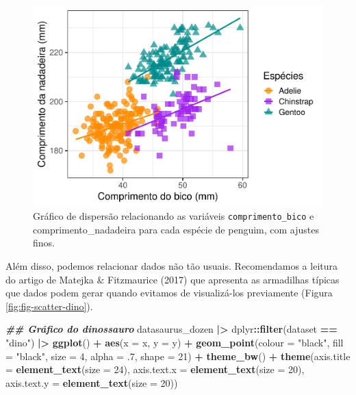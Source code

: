 \documentclass[
]{article}
\newenvironment{Shaded}{\begin{snugshade}}{\end{snugshade}}
\newcommand{\AttributeTok}[1]{\textcolor[rgb]{0.13,0.29,0.53}{#1}}
\newcommand{\DecValTok}[1]{\textcolor[rgb]{0.00,0.00,0.81}{#1}}
\newcommand{\DocumentationTok}[1]{\textcolor[rgb]{0.56,0.35,0.01}{\textbf{\textit{#1}}}}
\newcommand{\FunctionTok}[1]{\textcolor[rgb]{0.13,0.29,0.53}{\textbf{#1}}}
\newcommand{\NormalTok}[1]{#1}
\newcommand{\SpecialCharTok}[1]{\textcolor[rgb]{0.81,0.36,0.00}{\textbf{#1}}}
\newcommand{\StringTok}[1]{\textcolor[rgb]{0.31,0.60,0.02}{#1}}
\begin{document}
\begin{figure}
\centering
\includegraphics{epr_files/figure-latex/fig-scatter-fino-1.pdf}
\caption{\label{fig:fig-scatter-fino}Gráfico de dispersão relacionando as variáveis \texttt{comprimento\_bico} e comprimento\_nadadeira para cada espécie de penguim, com ajustes finos.}
\end{figure}

Além disso, podemos relacionar dados não tão usuais. Recomendamos a leitura do artigo de Matejka \& Fitzmaurice (2017) que apresenta as armadilhas típicas que dados podem gerar quando evitamos de visualizá-los previamente (Figura \ref{fig:fig-scatter-dino}).

\begin{Shaded}
\begin{Highlighting}[]
\DocumentationTok{\#\# Gráfico do dinossauro}
\NormalTok{datasaurus\_dozen }\SpecialCharTok{|\textgreater{}} 
\NormalTok{    dplyr}\SpecialCharTok{::}\FunctionTok{filter}\NormalTok{(dataset }\SpecialCharTok{==} \StringTok{"dino"}\NormalTok{) }\SpecialCharTok{|\textgreater{}} 
    \FunctionTok{ggplot}\NormalTok{() }\SpecialCharTok{+}
    \FunctionTok{aes}\NormalTok{(}\AttributeTok{x =}\NormalTok{ x, }\AttributeTok{y =}\NormalTok{ y) }\SpecialCharTok{+}
    \FunctionTok{geom\_point}\NormalTok{(}\AttributeTok{colour =} \StringTok{"black"}\NormalTok{, }\AttributeTok{fill =} \StringTok{"black"}\NormalTok{, }
               \AttributeTok{size =} \DecValTok{4}\NormalTok{, }\AttributeTok{alpha =}\NormalTok{ .}\DecValTok{7}\NormalTok{, }\AttributeTok{shape =} \DecValTok{21}\NormalTok{) }\SpecialCharTok{+}
    \FunctionTok{theme\_bw}\NormalTok{() }\SpecialCharTok{+}
    \FunctionTok{theme}\NormalTok{(}\AttributeTok{axis.title =} \FunctionTok{element\_text}\NormalTok{(}\AttributeTok{size =} \DecValTok{24}\NormalTok{),}
          \AttributeTok{axis.text.x =} \FunctionTok{element\_text}\NormalTok{(}\AttributeTok{size =} \DecValTok{20}\NormalTok{),}
          \AttributeTok{axis.text.y =} \FunctionTok{element\_text}\NormalTok{(}\AttributeTok{size =} \DecValTok{20}\NormalTok{))}
\end{Highlighting}
\end{Shaded}
\end{document}
